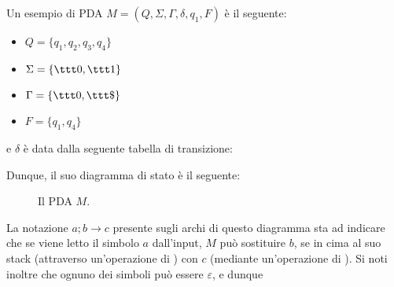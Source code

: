\documentclass[a4paper, 12pt]{report}
\begin{document}
    \begin{example}[PDA]
        \label{pda ex}
        Un esempio di PDA $M = (Q, \Sigma, \Gamma, \delta, q_1, F)$ è il seguente:

        \begin{itemize}
            \item $Q = \{q_1, q_2, q_3, q_4\}$
            \item $\Sigma = \{ \ttt 0, \ttt 1 \}$
            \item $\Gamma = \{ \ttt 0, \ttt \$\}$
            \item $F = \{ q_1, q_4 \}$
        \end{itemize}

        e $\delta$ è data dalla seguente tabella di transizione:


        Dunque, il suo diagramma di stato è il seguente:

        \begin{figure}[H]
            \centering
             \caption{Il PDA $M$.}
        \end{figure}

        La notazione $a; b \to c$ presente sugli archi di questo diagramma sta ad indicare che se viene letto il simbolo $a$ dall'input, $M$ può sostituire $b$, se in cima al suo stack (attraverso un'operazione di ) con $c$ (mediante un'operazione di ). Si noti inoltre che ognuno dei simboli può essere $\varepsilon$, e dunque


\end{example}
\end{document}
